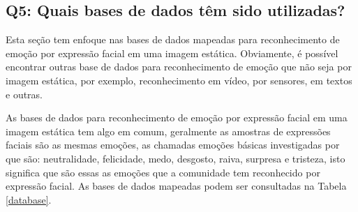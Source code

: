\subsection{Q5: Quais bases de dados têm sido utilizadas?}
Esta seção tem enfoque nas bases de dados mapeadas para reconhecimento de emoção por expressão facial em uma imagem estática.
Obviamente, é possível encontrar outras base de dados para reconhecimento de emoção que não seja 
por imagem estática, por exemplo, reconhecimento em vídeo, por sensores, em textos e outras.

As bases de dados para reconhecimento de emoção por expressão facial em uma imagem estática tem algo em comum, 
geralmente as amostras de expressões faciais são as mesmas emoções, as chamadas emoções básicas investigadas por \cite{ekman1994}
que são: neutralidade, felicidade, medo, desgosto, raiva, surpresa e tristeza, 
isto significa que são essas as emoções que a comunidade tem reconhecido por expressão facial.
As bases de dados mapeadas podem ser consultadas na Tabela \ref{database}.



